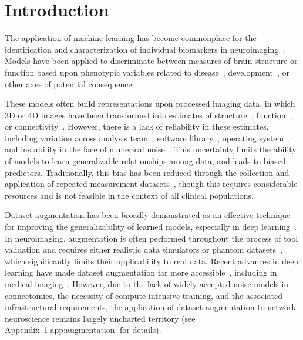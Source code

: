 \documentclass[10pt]{SelfArx} %
\affiliation{\textsuperscript{1}\textit{Montréal Neurological Institute, McGill University, Montréal, QC, Canada}}
\affiliation{\textsuperscript{2}\textit{Department of Computer Science and Software Engineering, Concordia University, Montréal, QC, Canada}}
\newcommand{\new}[1]{\color{blue}#1\color{black}\xspace}
\begin{document}
\flushbottom %
\maketitle %
\thispagestyle{empty} %

\pagestyle{fancy}
\section*{Introduction}

The application of machine learning has become commonplace for the identification and characterization of individual
biomarkers in neuroimaging~\cite{woo2017building}. Models have been applied to discriminate between measures of brain
structure or function based upon phenotypic variables related to
disease~\cite{Crossley2014-tg,Payabvash2019-tm,Tolan2018-nq}, development~\cite{Zhang2019-ko}, or other axes of
potential consequence~\cite{Zhu2018-cs,Park2015-uj}.

These models often build representations upon processed imaging data, in which 3D or 4D images have been transformed
into estimates of structure~\cite{wade2017machine}, function~\cite{weis2020sex}, or
connectivity~\cite{munsell2015evaluation}. However, there is a lack of reliability in these estimates, including
variation across analysis team~\cite{botvinik2020variability}, software library~\cite{bowring2019exploring}, operating
system~\cite{salari2020file}, and instability in the face of numerical noise~\cite{Kiar2020-kz}. This uncertainty
limits the ability of models to learn generalizable relationships among data, and leads to biased predictors.
Traditionally, this bias has been reduced through the collection and application of repeated-measurement
datasets~\cite{sudlow2015uk,zuo2014open}, though this requires considerable resources and is not feasible in the
context of all clinical populations.

\new{Dataset augmentation has been broadly demonstrated as an effective technique for improving the generalizability of
learned models, especially in deep learning~\cite{nalepa2019data}. In neuroimaging, augmentation is often performed
throughout the process of tool validation and requires either realistic data simulators or phantom
datasets~\cite{graham2016realistic}, which significantly limits their
applicability to real data. Recent advances in deep learning have made dataset augmentation far more
accessible~\cite{shorten2019survey}, including in medical imaging~\cite{yi2019generative,barile2021data}. However, due
to the lack of widely accepted noise models in connectomics, the necessity of compute-intensive training, and
the associated infrastructural requirements, the application of dataset augmentation to
network neuroscience remains largely uncharted
territory (see Appendix~1\ref{app:augmentation} for details).}
\end{document}
